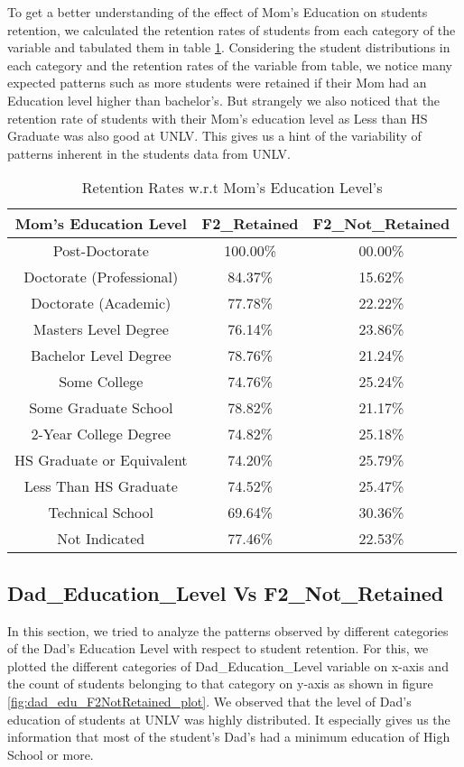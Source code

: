\documentclass[11pt,openright]{report}
\begin{document}
To get a better understanding of the effect of Mom's Education on students retention, we calculated the retention rates of students from each category of the variable and tabulated them in table  \ref{table:mom_edu_retentions}. Considering the student distributions in each category and the retention rates of the variable from table, we notice many expected patterns such as more students were retained if their Mom had an Education level higher than bachelor's. But strangely we also noticed that the retention rate of students with their Mom's education level as Less than HS Graduate was also good at UNLV. This gives us a hint of the variability of patterns inherent in the students data from UNLV.



\begin{table}[!t]
	\renewcommand{\arraystretch}{1.3}
	\caption{Retention Rates w.r.t Mom's Education Level's}
	\label{table:mom_edu_retentions}
	\centering
	\begin{tabular}{|c|c|c|}
		\hline
		\bfseries Mom's Education Level & \bfseries F2\_Retained & \bfseries F2\_Not\_Retained\\
		\hline
		Post-Doctorate  & 100.00\%  & 00.00\% \\ \hline
		Doctorate (Professional) & 84.37\% &  15.62\% \\ \hline
		Doctorate (Academic) & 77.78\% & 22.22\% \\ \hline
		Masters Level Degree    &   76.14\% &  23.86\% \\ \hline
		Bachelor Level Degree &  78.76\%  & 21.24\% \\ \hline
		Some College & 74.76\% & 25.24\% \\ \hline
		Some Graduate School  & 78.82\% &  21.17\% \\ \hline
		2-Year College Degree    &  74.82\%  & 25.18\% \\ \hline
		HS Graduate or Equivalent  & 74.20\% &  25.79\% \\ \hline
		Less Than HS Graduate     & 74.52\% &  25.47\% \\ \hline
		Technical School  &         69.64\% &  30.36\% \\ \hline
		Not Indicated         &    77.46\% & 22.53\% \\ \hline
	\end{tabular}
\end{table}



\subsection {Dad\_Education\_Level Vs F2\_Not\_Retained}
In this section, we tried to analyze the patterns observed by different categories of the Dad's Education Level with respect to student retention. For this, we plotted the different categories of Dad\_Education\_Level variable on x-axis and the count of students belonging to that category on y-axis as shown in figure \ref{fig:dad_edu_F2NotRetained_plot}. We observed that the level of Dad's education of students at UNLV was highly distributed. It especially gives us the information that most of the student's Dad's had a minimum education of High School or more.
\end{document}
